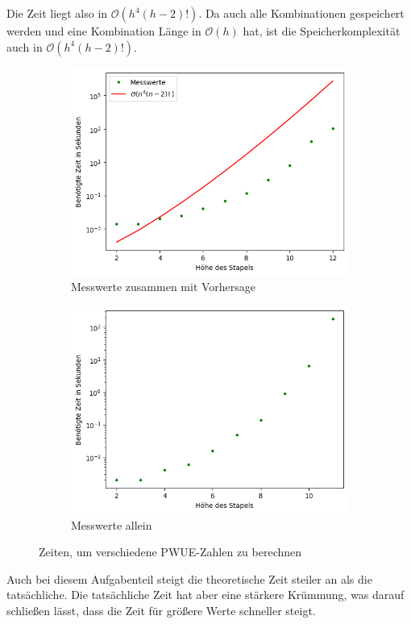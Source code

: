 \documentclass[a4paper,10pt,ngerman]{scrartcl}
\begin{document}
  Die Zeit liegt also in $\mathcal{O}(h^4(h-2)!)$. Da auch alle Kombinationen gespeichert werden und eine Kombination Länge in $\mathcal{O}(h)$ hat,
  ist die Speicherkomplexität auch in $\mathcal{O}(h^4(h-2)!)$. \\
  \begin{figure}
    \centering
    \begin{subfigure}{.5\textwidth}
      \centering
      \includegraphics[width=1\linewidth]{pwue-hoehe-bigo.png}
      \caption{Messwerte zusammen mit Vorhersage}
      \label{fig:sub1}
    \end{subfigure}%
    \begin{subfigure}{.5\textwidth}
      \centering
      \includegraphics[width=1\linewidth]{pwue-hoehe.png}
      \caption{Messwerte allein}
      \label{fig:sub2}
    \end{subfigure}
    \caption{Zeiten, um verschiedene PWUE-Zahlen zu berechnen}
    \label{fig:test}
  \end{figure}
  Auch bei diesem Aufgabenteil steigt die theoretische Zeit steiler an als die tatsächliche. Die tatsächliche Zeit hat aber eine stärkere Krümmung, was darauf
  schließen lässt, dass die Zeit für größere Werte schneller steigt.
\end{document}
